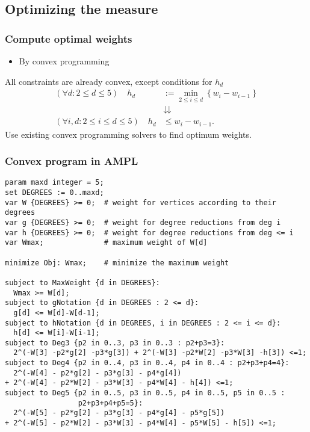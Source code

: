 \subsection{Optimizing the measure}

\begin{frame}
 \frametitle{Compute optimal weights}
 
 \begin{itemize}
  \item By convex programming \cite{GaspersS12}
 \end{itemize}
 
 \noindent
 All constraints are already convex, except conditions for $h_d$
 \begin{align*}
 (\forall d: 2 \le d \le 5) \quad h_d &:= \min_{2 \le i \le d} \left\{ w_i-w_{i-1} \right\}\\
 &\downdownarrows\\
 (\forall i,d: 2 \le i \le d \le 5) \quad h_d &\le w_i-w_{i-1}.
 \end{align*}
 Use existing convex programming solvers to find optimum weights.
\end{frame}

\begin{frame}[fragile]
 \frametitle{Convex program in AMPL}
{\scriptsize
 \begin{verbatim}
param maxd integer = 5;
set DEGREES := 0..maxd;
var W {DEGREES} >= 0;  # weight for vertices according to their degrees
var g {DEGREES} >= 0;  # weight for degree reductions from deg i
var h {DEGREES} >= 0;  # weight for degree reductions from deg <= i
var Wmax;              # maximum weight of W[d]

minimize Obj: Wmax;    # minimize the maximum weight

subject to MaxWeight {d in DEGREES}:
  Wmax >= W[d];
subject to gNotation {d in DEGREES : 2 <= d}:
  g[d] <= W[d]-W[d-1];
subject to hNotation {d in DEGREES, i in DEGREES : 2 <= i <= d}:
  h[d] <= W[i]-W[i-1];
subject to Deg3 {p2 in 0..3, p3 in 0..3 : p2+p3=3}:
  2^(-W[3] -p2*g[2] -p3*g[3]) + 2^(-W[3] -p2*W[2] -p3*W[3] -h[3]) <=1;
subject to Deg4 {p2 in 0..4, p3 in 0..4, p4 in 0..4 : p2+p3+p4=4}:
  2^(-W[4] - p2*g[2] - p3*g[3] - p4*g[4])
+ 2^(-W[4] - p2*W[2] - p3*W[3] - p4*W[4] - h[4]) <=1;
subject to Deg5 {p2 in 0..5, p3 in 0..5, p4 in 0..5, p5 in 0..5 :
                 p2+p3+p4+p5=5}:
  2^(-W[5] - p2*g[2] - p3*g[3] - p4*g[4] - p5*g[5])
+ 2^(-W[5] - p2*W[2] - p3*W[3] - p4*W[4] - p5*W[5] - h[5]) <=1;
\end{verbatim}
}
\end{frame}

